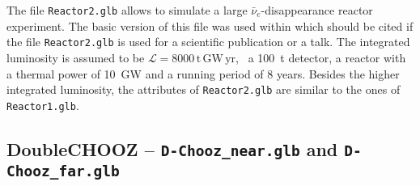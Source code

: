 The file {\tt Reactor2.glb} allows to simulate a large $\bar{\nu}_e$-disappearance reactor experiment. The basic
version of this file was used within \cite{Huber:2003pm} which should be cited if the file {\tt Reactor2.glb} is
used for a scientific publication or a talk. The integrated luminosity is assumed to be
$\mathrm{\mathcal{L} = 8000 \,t \, GW\, yr}$, \eg\ a 100~t detector, a reactor with a thermal power of 10~GW
and a running period of 8 years. Besides the higher integrated luminosity, the attributes of {\tt Reactor2.glb}
are similar to the ones of {\tt Reactor1.glb}.

\subsection*{DoubleCHOOZ -- {\tt D-Chooz\_near.glb} and {\tt D-Chooz\_far.glb}}

